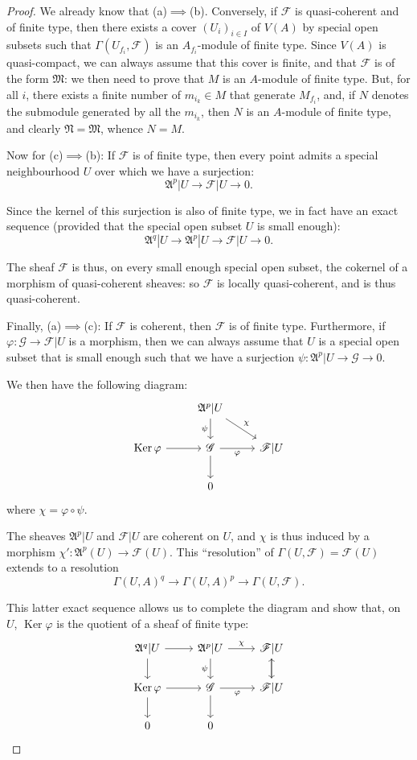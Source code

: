 \documentclass{article}
\theoremstyle{plain}
\theoremstyle{definition}
\newcommand{\sh}[1]{{\mathscr{#1}}}
\DeclareMathOperator{\Ker}{Ker}
\newcommand{\oldpage}[1]{\marginpar{\footnotesize$\Big\vert$ \textit{p.~#1}}}
\begin{document}
\begin{proof}
  We already know that (a)$\implies$(b).
  Conversely, if $\sh{F}$ is quasi-coherent and of finite type, then there exists a cover $(U_i)_{i\in I}$ of $V(A)$ by special open subsets such that $\Gamma(U_{f_i},\sh{F})$ is an $A_{f_i}$-module of finite type.
  Since $V(A)$ is quasi-compact, we can always assume that this cover is finite, and that $\sh{F}$ is of the form $\mathfrak{M}$:
  we then need to prove that $M$ is an $A$-module of finite type.
  But, for all $i$, there exists a finite number of $m_{i_k}\in M$ that generate $M_{f_i}$, and, if $N$ denotes the submodule generated by all the $m_{i_k}$, then $N$ is an $A$-module of finite type, and clearly $\mathfrak{N}=\mathfrak{M}$, whence $N=M$.

  \bigskip
  Now for (c)$\implies$(b):
  If $\sh{F}$ is of finite type, then every point admits a special neighbourhood $U$ over which we have a surjection:
\oldpage{1-10}
  \[
    \mathfrak{A}^p|U \to \sh{F}|U \to 0.
  \]

  Since the kernel of this surjection is also of finite type, we in fact have an exact sequence (provided that the special open subset $U$ is small enough):
  \[
    \mathfrak{A}^q|U \to \mathfrak{A}^p|U \to \sh{F}|U \to 0.
  \]

  The sheaf $\sh{F}$ is thus, on every small enough special open subset, the cokernel of a morphism of quasi-coherent sheaves:
  so $\sh{F}$ is locally quasi-coherent, and is thus quasi-coherent.

  \bigskip
  Finally, (a)$\implies$(c):
  If $\sh{F}$ is coherent, then $\sh{F}$ is of finite type.
  Furthermore, if $\varphi\colon\sh{G}\to\sh{F}|U$ is a morphism, then we can always assume that $U$ is a special open subset that is small enough such that we have a surjection $\psi\colon\mathfrak{A}^p|U\to\sh{G}\to0$.

  We then have the following diagram:
  \[
    \begin{tikzcd}
      & \mathfrak{A}^p|U \dar[swap,"\psi"] \drar["\chi"] &
    \\\Ker\varphi \rar & \sh{G} \rar[swap,"\varphi"] \dar & \sh{F}|U
    \\ & 0 &
    \end{tikzcd}
  \]
  where $\chi=\varphi\circ\psi$.

  The sheaves $\mathfrak{A}^p|U$ and $\sh{F}|U$ are coherent on $U$, and $\chi$ is thus induced by a morphism $\chi'\colon\mathfrak{A}^p(U)\to\sh{F}(U)$.
  This ``resolution'' of $\Gamma(U,\sh{F})=\sh{F}(U)$ extends to a resolution
  \[
    \Gamma(U,A)^q \to \Gamma(U,A)^p \to \Gamma(U,\sh{F}).
  \]

  This latter exact sequence allows us to complete the diagram and show that, on $U$, $\Ker\varphi$ is the quotient of a sheaf of finite type:
  \[
    \begin{tikzcd}
      \mathfrak{A}^q|U \rar \dar & \mathfrak{A}^p|U \rar["\chi"] \dar[swap,"\psi"] & \sh{F}|U \dar
    \\\Ker\varphi \rar \dar & \sh{G} \rar[swap,"\varphi"] \dar & \sh{F}|U \uar
    \\ 0 & 0 &
    \end{tikzcd}
  \]
\end{proof}
\end{document}
